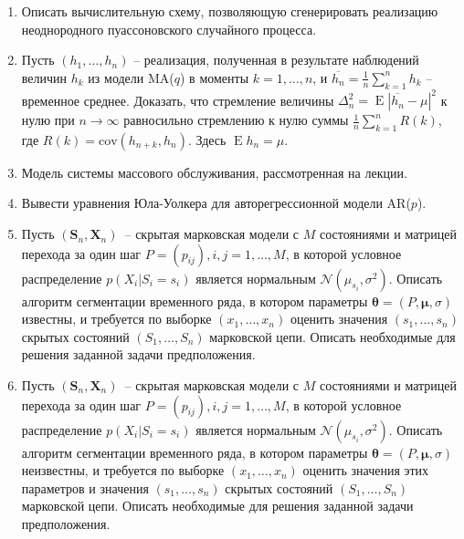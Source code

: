 \documentclass[a4paper,12pt]{extreport}
\renewcommand{\=}[1]{\stackrel{#1}{=}} %
\newcommand{\Expect}{\mathop{{}\mathrm{E}}}
\begin{document}
\begin{enumerate}
	\item Описать вычислительную схему, позволяющую
	сгенерировать реализацию неоднородного пуассоновского случайного процесса.

	\item Пусть $(h_1, \ldots, h_n)$ -- реализация, полученная 
	в результате наблюдений величин $h_k$ из модели MA($q$)
	в моменты $k=1, \ldots, n$, и $\overline{h_n} = \frac 1 n \sum\limits_{k=1} ^n h_k$ --
	временное среднее. 
	Доказать, что стремление величины $\Delta_n^2 = \Expect |\overline{h_n} - \mu|^2$ к нулю 
	при $n \to \infty$ равносильно стремлению к нулю суммы $\frac 1 n \sum\limits_{k=1} ^n R(k)$,
	где $R(k) = \mathrm{cov}(h_{n + k}, h_n)$. Здесь $\Expect h_n = \mu$.

	\item Модель системы массового обслуживания, рассмотренная на лекции.

	\item Вывести уравнения Юла-Уолкера для авторегрессионной модели AR($p$).

	\item Пусть $(\bm{S}_n, \bm{X}_n)$~--
	скрытая марковская модели с $M$ состояниями и матрицей
	перехода за один шаг $P = (p_{ij}), i, j = 1, \ldots, M$,
	в которой условное распределение $p(X_i | S_i = s_i)$ является
	нормальным $\mathcal{N}(\mu_{s_i}, \sigma^2)$.
	Описать алгоритм сегментации временного ряда, в котором 
	параметры $\bm{\theta} = (P, \bm{\mu}, \sigma)$ известны,
	и требуется по выборке $(x_1, \ldots, x_n)$ 
	оценить значения $(s_1, \ldots, s_n)$ скрытых состояний
	$(S_1, \ldots, S_n)$  марковской цепи. Описать необходимые
	для решения заданной задачи предположения.

	\item Пусть $(\bm{S}_n, \bm{X}_n)$~--
	скрытая марковская модели с $M$ состояниями и матрицей
	перехода за один шаг $P = (p_{ij}), i, j = 1, \ldots, M$,
	в которой условное распределение $p(X_i | S_i = s_i)$ является
	нормальным $\mathcal{N}(\mu_{s_i}, \sigma^2)$.
	Описать алгоритм сегментации временного ряда, в котором 
	параметры $\bm{\theta} = (P, \bm{\mu}, \sigma)$ неизвестны,
	и требуется по выборке $(x_1, \ldots, x_n)$ 
	оценить значения этих параметров
	и значения $(s_1, \ldots, s_n)$ скрытых состояний
	$(S_1, \ldots, S_n)$ марковской цепи. Описать необходимые
	для решения заданной задачи предположения.

\end{enumerate}

\newpage

\section*{}
\end{document}
